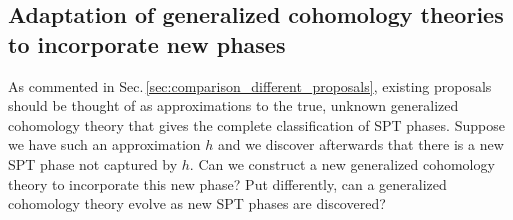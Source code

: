 \documentclass[sort&compress]{elsarticle}
\theoremstyle{theoremstyle}
\theoremstyle{framedtheoremstyle}
\theoremstyle{definitionstyle}
\theoremstyle{definitionstyle}
\theoremstyle{definitionstyle}
\theoremstyle{definitionstyle}
\theoremstyle{nameddefinitionstyle}
\theoremstyle{framednameddefinitionstyle}
\theoremstyle{proofstyle}
\theoremstyle{definitionstyle}
\newcommand{\isomorphic}{\cong}
\newcommand{\paren}[1]{\left( #1 \right)}
\begin{document}










\subsection{Adaptation of generalized cohomology theories to incorporate new phases\label{subsec:ubiquity_generalized_cohomology_theories}}

As commented in Sec.\,\ref{sec:comparison_different_proposals}, existing proposals should be thought of as approximations to the true, unknown generalized cohomology theory that gives the complete classification of SPT phases. Suppose we have such an approximation $h$ and we discover afterwards that there is a new SPT phase not captured by $h$. Can we construct a new generalized cohomology theory to incorporate this new phase? Put differently, can a generalized cohomology theory evolve as new SPT phases are discovered?
\end{document}
